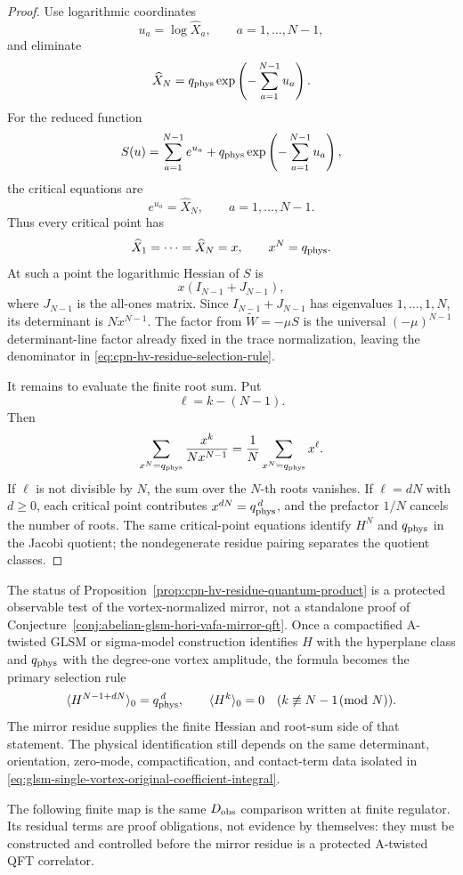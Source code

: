 \begin{proof}
Use logarithmic coordinates
\[
  u_a=\log\widehat X_a,\qquad a=1,\ldots,N-1,
\]
and eliminate
\[
  \widehat X_N=q_{\rm phys}\exp\left(-\sum_{a=1}^{N-1}u_a\right).
\]
For the reduced function
\[
  S(u)=\sum_{a=1}^{N-1}e^{u_a}
  +
  q_{\rm phys}\exp\left(-\sum_{a=1}^{N-1}u_a\right),
\]
the critical equations are
\[
  e^{u_a}=\widehat X_N,\qquad a=1,\ldots,N-1.
\]
Thus every critical point has
\[
  \widehat X_1=\cdots=\widehat X_N=x,
  \qquad
  x^N=q_{\rm phys}.
\]
At such a point the logarithmic Hessian of \(S\) is
\[
  x(I_{N-1}+J_{N-1}),
\]
where \(J_{N-1}\) is the all-ones matrix.  Since \(I_{N-1}+J_{N-1}\) has
eigenvalues \(1,\ldots,1,N\), its determinant is \(N x^{N-1}\).  The factor
from \(\widetilde W=-\mu S\) is the universal \((-\mu)^{N-1}\) determinant-line
factor already fixed in the trace normalization, leaving the denominator in
\eqref{eq:cpn-hv-residue-selection-rule}.

It remains to evaluate the finite root sum.  Put
\[
  \ell=k-(N-1).
\]
Then
\[
  \sum_{x^N=q_{\rm phys}}\frac{x^k}{N x^{N-1}}
  =
  \frac1N\sum_{x^N=q_{\rm phys}}x^\ell .
\]
If \(\ell\) is not divisible by \(N\), the sum over the \(N\)-th roots vanishes.
If \(\ell=dN\) with \(d\ge0\), each critical point contributes \(x^{dN}
=q_{\rm phys}^{\,d}\), and the prefactor \(1/N\) cancels the number of roots.
The same critical-point equations identify \(H^N\) and \(q_{\rm phys}\) in the
Jacobi quotient; the nondegenerate residue pairing separates the quotient
classes.
\end{proof}

The status of Proposition~\ref{prop:cpn-hv-residue-quantum-product} is a
protected observable test of the vortex-normalized mirror, not a standalone
proof of Conjecture~\ref{conj:abelian-glsm-hori-vafa-mirror-qft}.  Once a
compactified A-twisted GLSM or
sigma-model construction identifies \(H\) with the hyperplane class and
\(q_{\rm phys}\) with the degree-one vortex amplitude, the formula becomes the
primary selection rule
\[
  \langle H^{N-1+dN}\rangle_{0}=q_{\rm phys}^{\,d},
  \qquad
  \langle H^k\rangle_0=0
  \quad(k\not\equiv N-1\!\!\pmod{N}).
\]
The mirror residue supplies the finite Hessian and root-sum side of that
statement.  The physical identification still depends on the same determinant,
orientation, zero-mode, compactification, and contact-term data isolated in
\eqref{eq:glsm-single-vortex-original-coefficient-integral}.

The following finite map is the same \(D_{\rm obs}\) comparison written at
finite regulator.  Its residual terms are proof obligations, not evidence by
themselves: they must be constructed and controlled before the mirror residue
is a protected A-twisted QFT correlator.

